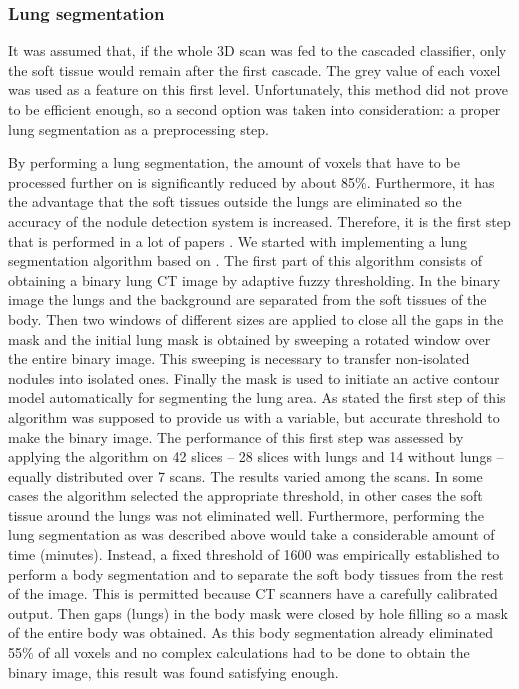 \subsubsection{Lung segmentation}
It was assumed that, if the whole 3D scan was fed to the cascaded classifier,
only the soft tissue would remain after the first cascade. The grey value of
each voxel was used as a feature on this first level. Unfortunately, this method
did not prove to be efficient enough, so a second option was taken into
consideration: a proper lung segmentation as a preprocessing step.

By performing a lung segmentation, the amount of voxels that have to be
processed further on is significantly reduced by about 85\%. Furthermore, it has
the advantage that the soft tissues outside the lungs are eliminated so the
accuracy of the nodule detection system is increased. Therefore, it is the first
step that is performed in a lot of papers \cite{keshani, elbaz, teramoto}. We
started with implementing a lung segmentation algorithm based on \cite{keshani}.
The first part of this algorithm consists of obtaining a binary lung CT image by
adaptive fuzzy thresholding. In the binary image the lungs and the background
are separated from the soft tissues of the body. Then two windows of different
sizes are applied to close all the gaps in the mask and the initial lung mask is
obtained by sweeping a rotated window over the entire binary image. This
sweeping is necessary to transfer non-isolated nodules into isolated ones.
Finally the mask is used to initiate an active contour model automatically for
segmenting the lung area. As stated the first step of this algorithm was
supposed to provide us with a variable, but accurate threshold to make the
binary image. The performance of this first step was assessed by applying the
algorithm on 42 slices -- 28 slices with lungs and 14 without lungs -- equally
distributed over 7 scans. The results varied among the scans. In some cases the
algorithm selected the appropriate threshold, in other cases the soft tissue
around the lungs was not eliminated well. Furthermore, performing the lung
segmentation as was described above would take a considerable amount of time
(minutes). Instead, a fixed threshold of 1600 was empirically established to
perform a body segmentation and to separate the soft body tissues from the rest
of the image. This is permitted because CT scanners have a carefully calibrated
output. Then gaps (lungs) in the body mask were closed by hole filling so a mask
of the entire body was obtained. As this body segmentation already eliminated
55\% of all voxels and no complex calculations had to be done to obtain the
binary image, this result was found satisfying enough.

